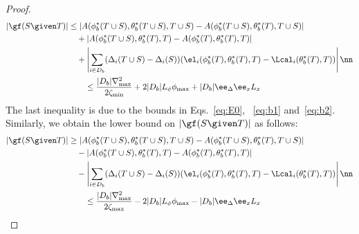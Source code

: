 \begin{proof}
\begin{align}
     \left| \gf(S\given     T) \right|
   & \le  \left|A(\phi^* _b (T\cup S),  \theta^* _b (T\cup S), T\cup S) - A(\phi^* _b (T\cup S),  \theta^* _b (T), T\cup S)\right|\nonumber \\
&\quad  + \left| A(\phi^* _b (T\cup S),  \theta^* _b (T), T)  - A(\phi^* _b (T),  \theta^* _b (T), T)\right|\nonumber \\
  &\quad +\left| \sum_{i\in D_b}(\Delta_i(T\cup S) - \Delta_i (S) ) ( \el_i(\phi_b ^*(T) , \theta_b ^*(T), T) - \Lcal_i (\theta _b ^*(T), T) )\right| \nn\\
&\qquad \le \frac{|D_b|\nabla_{\max} ^2}{2\zeta_{\min}}+2|D_b| L_\phi \phi_{\max} + |D_b| \ee_{\Delta} \ee_x L_x 
\label{eq:EE3}
\end{align}
The last inequality is due to the bounds in Eqs.~\eqref{eq:E0}, ~\eqref{eq:b1} and~\eqref{eq:b2}. Similarly, we obtain the lower bound on  $   \left| \gf(S\given     T) \right|$ as follows:
\begin{align}
     \left| \gf(S\given     T) \right|
   & \ge  \left|A(\phi^* _b (T\cup S),  \theta^* _b (T\cup S), T\cup S) - A(\phi^* _b (T\cup S),  \theta^* _b (T), T\cup S)\right|\nonumber \\
&\quad  - \left| A(\phi^* _b (T\cup S),  \theta^* _b (T), T)  - A(\phi^* _b (T),  \theta^* _b (T), T)\right|\nonumber \\
  &\quad -\left| \sum_{i\in D_b}(\Delta_i(T\cup S) - \Delta_i (S) ) ( \el_i(\phi_b ^*(T) , \theta_b ^*(T), T) - \Lcal_i (\theta _b ^*(T), T) )\right| \nn\\
&\qquad \le \frac{|D_b|\nabla_{\max} ^2}{2\zeta_{\max}}-2|D_b| L_\phi \phi_{\max} - |D_b| \ee_{\Delta} \ee_x L_x 
\label{eq:EE4}
\end{align}


\end{proof}
